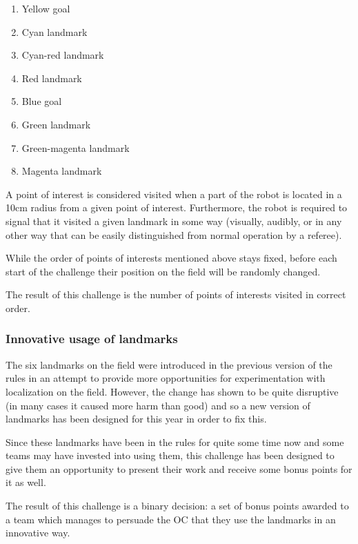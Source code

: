 \documentclass{article}
\begin{document}
\begin{enumerate}
    \item Yellow goal
    \item Cyan landmark
    \item Cyan-red landmark
    \item Red landmark
    \item Blue goal
    \item Green landmark
    \item Green-magenta landmark
    \item Magenta landmark
\end{enumerate}

A point of interest is considered visited when a part of the
    robot is located in a 10cm radius from a given point of interest.
    Furthermore, the robot is required to signal that it visited a given
    landmark in some way (visually, audibly, or in any other way that can be
    easily distinguished from normal operation by a referee).

While the order of points of interests mentioned above stays
    fixed, before each start of the challenge their position on the field will
    be randomly changed.

The result of this challenge is the number of points of
    interests visited in correct order.

\subsubsection{Innovative usage of landmarks}

The six landmarks on the field were introduced in the previous
    version of the rules in an attempt to provide more opportunities for
    experimentation with localization on the field. However, the change has
    shown to be quite disruptive (in many cases it caused more harm than good)
    and so a new version of landmarks has been designed for this year in order
    to fix this.

Since these landmarks have been in the rules for quite some
    time now and some teams may have invested into using them, this challenge
    has been designed to give them an opportunity to present their work and
    receive some bonus points for it as well.

The result of this challenge is a binary decision: a set of
    bonus points awarded to a team which manages to persuade the OC that they
    use the landmarks in an innovative way.
\end{document}
